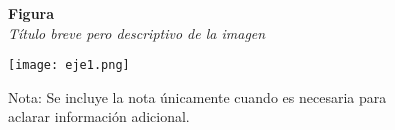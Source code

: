 \documentclass[12pt,letterpaper]{report}
\begin{document}
	\begin{figure}[ht]
		
		\textbf{Figura \thefigure}\\[0.5em]
		\textit{Título breve pero descriptivo de la imagen}\\[1em]
		\begin{center}
			
			\texttt{[image: eje1.png]}\\[1em]
		\end{center}
		
		
		\normalsize Nota: Se incluye la nota únicamente cuando es necesaria para aclarar información adicional.
		
	\end{figure}
	
\end{document}
